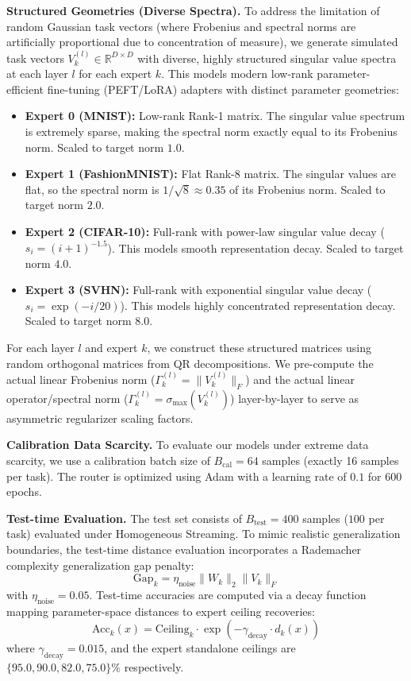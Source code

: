 \textbf{Structured Geometries (Diverse Spectra).} To address the limitation of random Gaussian task vectors (where Frobenius and spectral norms are artificially proportional due to concentration of measure), we generate simulated task vectors $V_k^{(l)} \in \mathbb{R}^{D \times D}$ with diverse, highly structured singular value spectra at each layer $l$ for each expert $k$. This models modern low-rank parameter-efficient fine-tuning (PEFT/LoRA) adapters with distinct parameter geometries:
\begin{itemize}
    \item \textbf{Expert 0 (MNIST):} Low-rank Rank-1 matrix. The singular value spectrum is extremely sparse, making the spectral norm exactly equal to its Frobenius norm. Scaled to target norm $1.0$.
    \item \textbf{Expert 1 (FashionMNIST):} Flat Rank-8 matrix. The singular values are flat, so the spectral norm is $1/\sqrt{8} \approx 0.35$ of its Frobenius norm. Scaled to target norm $2.0$.
    \item \textbf{Expert 2 (CIFAR-10):} Full-rank with power-law singular value decay ($s_i = (i+1)^{-1.5}$). This models smooth representation decay. Scaled to target norm $4.0$.
    \item \textbf{Expert 3 (SVHN):} Full-rank with exponential singular value decay ($s_i = \exp(-i/20)$). This models highly concentrated representation decay. Scaled to target norm $8.0$.
\end{itemize}
For each layer $l$ and expert $k$, we construct these structured matrices using random orthogonal matrices from QR decompositions. We pre-compute the actual linear Frobenius norm ($\Gamma_k^{(l)} = \|V_k^{(l)}\|_F$) and the actual linear operator/spectral norm ($\Gamma_k^{(l)} = \sigma_{\max}(V_k^{(l)})$) layer-by-layer to serve as asymmetric regularizer scaling factors.

\textbf{Calibration Data Scarcity.} To evaluate our models under extreme data scarcity, we use a calibration batch size of $B_{\text{cal}} = 64$ samples (exactly 16 samples per task). The router is optimized using Adam with a learning rate of $0.1$ for $600$ epochs.

\textbf{Test-time Evaluation.} The test set consists of $B_{\text{test}} = 400$ samples ($100$ per task) evaluated under Homogeneous Streaming. To mimic realistic generalization boundaries, the test-time distance evaluation incorporates a Rademacher complexity generalization gap penalty:
\begin{equation}
    \text{Gap}_k = \eta_{\text{noise}} \|W_k\|_2 \|V_k\|_F
\end{equation}
with $\eta_{\text{noise}} = 0.05$. Test-time accuracies are computed via a decay function mapping parameter-space distances to expert ceiling recoveries:
\begin{equation}
    \text{Acc}_k(x) = \text{Ceiling}_k \cdot \exp\left(-\gamma_{\text{decay}} \cdot d_k(x)\right)
\end{equation}
where $\gamma_{\text{decay}} = 0.015$, and the expert standalone ceilings are $\{95.0, 90.0, 82.0, 75.0\}\%$ respectively.

